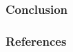 \documentclass[english, fleqn]{beamer}
\begin{document}

\begin{frame}
    \frametitle{Conclusion}

\end{frame}

\begin{frame}
    \titlepage
\end{frame}

\begin{frame}
    \frametitle{References}

    \printbibliography
\end{frame}
\end{document}
